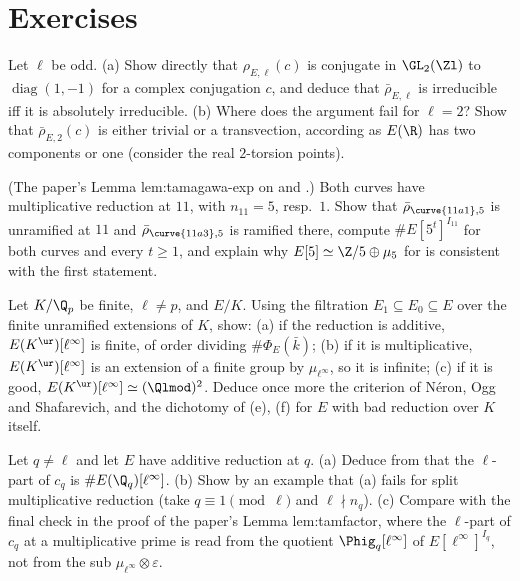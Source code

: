 \section{Exercises}\label{sec:galrep:exercises}

\begin{exercise}\label{ex:galrep:complex-conjugation}
Let $\ell$ be odd. (a) Show directly that $\rho_{E,\ell}(c)$ is conjugate in $\GL_2(\Zl)$ to $\operatorname{diag}(1,-1)$ for a complex conjugation $c$, and deduce that $\bar\rho_{E,\ell}$
is irreducible iff it is absolutely irreducible. (b) Where does the argument fail for $\ell=2$? Show that $\bar\rho_{E,2}(c)$ is either trivial or a transvection,
according as $E(\R)$ has two components or one (consider the real $2$-torsion points).
\end{exercise}

\begin{exercise}\label{ex:galrep:eleven-five}
(The paper's Lemma lem:tamagawa-exp on  and .) Both curves have multiplicative reduction at $11$, with $n_{11}=5$, resp.\ $1$. Show that
$\bar\rho_{\curve{11a1},5}$ is unramified at $11$ and $\bar\rho_{\curve{11a3},5}$ is ramified there, compute $\#E[5^t]^{I_{11}}$ for both curves and every $t\ge1$, and explain why
$E[5]\simeq\Z/5\oplus\mu_5$ for  is consistent with the first statement.
\end{exercise}

\begin{exercise}\label{ex:galrep:torsion-ur}
Let $K/\Q_p$ be finite, $\ell\ne p$, and $E/K$. Using the filtration $E_1\subseteq E_0\subseteq E$ over the finite unramified extensions of $K$, show: (a) if the
reduction is additive, $E(K^{\ur})[\ell^\infty]$ is finite, of order dividing $\#\Phi_E(\bar k)$; (b) if it is multiplicative, $E(K^{\ur})[\ell^\infty]$ is an extension of a
finite group by $\mu_{\ell^\infty}$, so it is infinite; (c) if it is good, $E(K^{\ur})[\ell^\infty]\simeq(\Qlmod)^2$. Deduce once more the criterion of N\'eron, Ogg and
Shafarevich, and the dichotomy of (e), (f) for $E$ with bad reduction over $K$ itself.
\end{exercise}

\begin{exercise}\label{ex:galrep:tamagawa-l-part}
Let $q\ne\ell$ and let $E$ have additive reduction at $q$. (a) Deduce from  that the $\ell$-part of $c_q$ is
$\#E(\Q_q)[\ell^\infty]$. (b) Show by an example that (a) fails for split multiplicative reduction (take $q\equiv1\pmod\ell$ and $\ell\nmid n_q$). (c) Compare with the final
check in the proof of the paper's Lemma lem:tamfactor, where the $\ell$-part of $c_q$ at a multiplicative prime is read from the quotient
$\Phig_q[\ell^\infty]$ of $E[\ell^\infty]^{I_q}$, not from the sub $\mu_{\ell^\infty}\otimes\varepsilon$.
\end{exercise}

